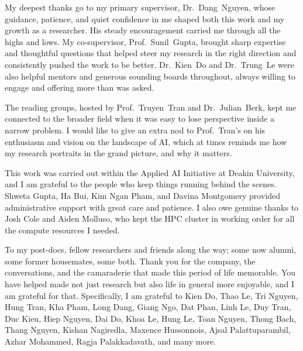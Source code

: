 \documentclass[12pt, a4paper, twoside]{book}
\numberwithin{equation}{chapter}
\theoremstyle{plain}
\theoremstyle{definition}
\theoremstyle{remark}
\newenvironment{foldable}{}{}
\begin{document}
\begin{foldable}
  My deepest thanks go to my primary supervisor, Dr.\ Dang~Nguyen, whose guidance, patience, and quiet confidence in me shaped both this work and my growth as a researcher.
  His steady encouragement carried me through all the highs and lows.
  My co-supervisor, Prof.\ Sunil~Gupta, brought sharp expertise and thoughtful questions that helped steer my research in the right direction and consistently pushed the work to be better.
  Dr.\ Kien~Do and Dr.\ Trung~Le were also helpful mentors and generous sounding boards throughout, always willing to engage and offering more than was asked.
\end{foldable}

\begin{foldable}
  The reading groups, hosted by Prof.\ Truyen~Tran and Dr.\ Julian~Berk, kept me connected to the broader field when it was easy to lose perspective inside a narrow problem.
  I would like to give an extra nod to Prof.\ Tran's on his enthusiasm and vision on the landscape of AI, which at times reminds me how my research portraits in the grand picture, and why it matters.
\end{foldable}

\begin{foldable}
  This work was carried out within the Applied AI Initiative at Deakin University, and I am grateful to the people who keep things running behind the scenes.
  Shweta Gupta, Ha Bui, Kim Ngan Pham, and Davina Montgomery provided administrative support with great care and patience.
  I also owe genuine thanks to Josh Cole and Aiden Molluso, who kept the HPC cluster in working order for all the compute resources I needed.
\end{foldable}

\begin{foldable}
  To my post-docs, fellow researchers and friends along the way; some now alumni, some former housemates, some both.
  Thank you for the company, the conversations, and the camaraderie that made this period of life memorable.
  You have helped made not just research but also life in general more enjoyable, and I am grateful for that.
  Specifically, I am grateful to Kien Do, Thao Le, Tri Nguyen, Hung Tran, Kha Pham, Long Dang, Giang Ngo, Dat Phan, Linh Le, Duy Tran, Duc Kieu, Hiep Nguyen, Dai Do, Khoa Le, Hung Le, Toan Nguyen, Thong Bach, Thang Nguyen, Kishan Nagiredla, Maxence Hussonnois, Ajsal Palattuparambil, Azhar Mohammed, Ragja Palakkadavath, and many more.
\end{foldable}
\end{document}
